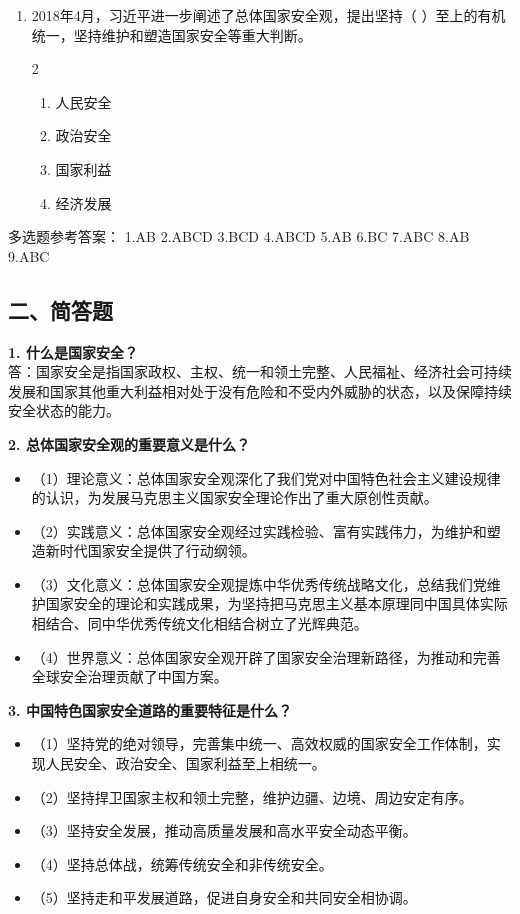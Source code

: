 \documentclass[a4paper,11pt]{ctexart}
\begin{document}
\begin{enumerate}
    \item 2018年4月，习近平进一步阐述了总体国家安全观，提出坚持（ ）至上的有机统一，坚持维护和塑造国家安全等重大判断。
    \begin{multicols}{2}
    \begin{enumerate}
        \item 人民安全
        \item 政治安全
        \item 国家利益
        \item 经济发展
    \end{enumerate}
    \end{multicols}
\end{enumerate}

\begin{answerbox}
多选题参考答案：
1.AB \quad 2.ABCD \quad 3.BCD \quad 4.ABCD \quad 5.AB \quad 6.BC \quad 7.ABC \quad 8.AB \quad 9.ABC
\end{answerbox}

\subsection{二、简答题}
\textbf{1. 什么是国家安全？} \\
答：国家安全是指国家政权、主权、统一和领土完整、人民福祉、经济社会可持续发展和国家其他重大利益相对处于没有危险和不受内外威胁的状态，以及保障持续安全状态的能力。

\textbf{2. 总体国家安全观的重要意义是什么？}
\begin{itemize}
    \item （1）理论意义：总体国家安全观深化了我们党对中国特色社会主义建设规律的认识，为发展马克思主义国家安全理论作出了重大原创性贡献。
    \item （2）实践意义：总体国家安全观经过实践检验、富有实践伟力，为维护和塑造新时代国家安全提供了行动纲领。
    \item （3）文化意义：总体国家安全观提炼中华优秀传统战略文化，总结我们党维护国家安全的理论和实践成果，为坚持把马克思主义基本原理同中国具体实际相结合、同中华优秀传统文化相结合树立了光辉典范。
    \item （4）世界意义：总体国家安全观开辟了国家安全治理新路径，为推动和完善全球安全治理贡献了中国方案。
\end{itemize}

\textbf{3. 中国特色国家安全道路的重要特征是什么？}
\begin{itemize}
    \item （1）坚持党的绝对领导，完善集中统一、高效权威的国家安全工作体制，实现人民安全、政治安全、国家利益至上相统一。
    \item （2）坚持捍卫国家主权和领土完整，维护边疆、边境、周边安定有序。
    \item （3）坚持安全发展，推动高质量发展和高水平安全动态平衡。
    \item （4）坚持总体战，统筹传统安全和非传统安全。
    \item （5）坚持走和平发展道路，促进自身安全和共同安全相协调。
\end{itemize}
\end{document}

